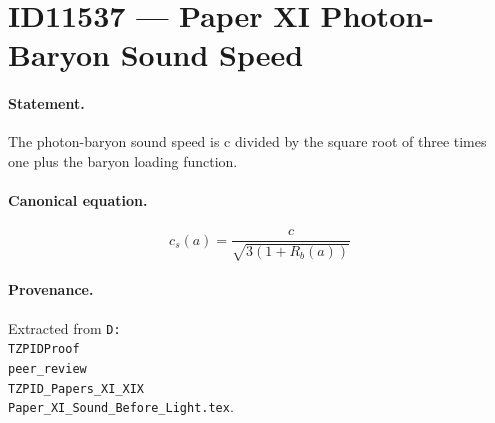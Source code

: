 \section*{ID11537 --- Paper XI Photon-Baryon Sound Speed}

\paragraph{Statement.}
The photon-baryon sound speed is c divided by the square root of three times one plus the baryon loading function.

\paragraph{Canonical equation.}
\[
c_s(a)=\frac{c}{\sqrt{3(1+R_b(a))}}
\]

\paragraph{Provenance.}
Extracted from \texttt{D:\\TZPIDProof\\peer\_review\\TZPID\_Papers\_XI\_XIX\\Paper\_XI\_Sound\_Before\_Light.tex}.
